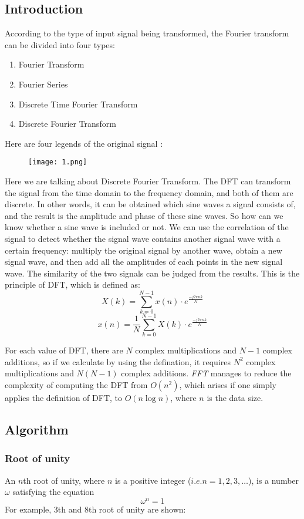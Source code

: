 \documentclass[12pt,a4paper]{article}
\begin{document}
\subsection{Introduction}
According to the type of input signal being transformed, the Fourier transform can be divided into four types:
\begin{enumerate}
\item Fourier Transform
\item Fourier Series
\item Discrete Time Fourier Transform
\item Discrete Fourier Transform
\end{enumerate}
Here are four legends of the  original signal :
\newpage
\begin{figure}[h]
\begin{center}
\texttt{[image: 1.png]} 
\end{center}
\end{figure}
Here we are talking about Discrete Fourier Transform. The DFT can transform the signal from the time domain to the frequency domain, and both of them are discrete. In other words, it can be obtained which sine waves a signal consists of, and the result is the amplitude and phase of these sine waves. So how can we know whether a sine wave is included or not. We can use the correlation of the signal to detect whether the signal wave contains another signal wave with a certain frequency: multiply the original signal by another wave, obtain a new signal wave, and then add all the amplitudes of each points in the new signal wave. The similarity of the two signals can be judged from the results. This is the principle of DFT, which is defined as:
$$X(k)=\sum^{N-1}_{k=0} x(n)\cdot e^{\frac{-j2\pi nk}{N}}$$
$$x(n)=\dfrac{1}{N} \sum^{N-1}_{k=0} X(k)\cdot e^{\frac{-j2\pi nk}{N}}$$

For each value of DFT, there are $N$ complex multiplications and $N-1$ complex additions, so if we calculate by using the defination, it requires $N^2$ complex multiplications and $N(N-1)$
complex additions. \textit{FFT} manages to reduce the complexity of computing the DFT from $O(n^{2})$, which arises if one simply applies the definition of DFT, to $O(n\log n)$, where $n$ is the data size.
\subsection{Algorithm}
\subsubsection{Root of unity}
An $n$th root of unity, where $n$ is a positive integer ($i.e. n=1, 2, 3, \ldots$), is a number $\omega$ satisfying the equation $$\omega^{n}=1$$
For example, 3th and 8th root of unity are shown:
\end{document}
